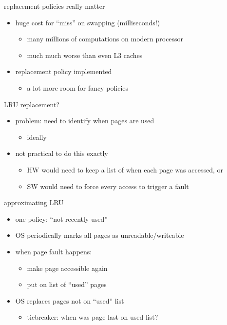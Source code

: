 
\begin{frame}{replacement policies really matter}
\begin{itemize}
\item huge cost for ``miss'' on swapping (milliseconds!)
\begin{itemize}
\item many millions of computations on modern processor
\item much much worse than even L3 caches
\end{itemize}
\item replacement policy implemented 
\begin{itemize}
\item a lot more room for fancy policies
\end{itemize}
\end{itemize}
\end{frame}

\begin{frame}{LRU replacement?}
\begin{itemize}
\item problem: need to identify when pages are used
    \begin{itemize}
    \item ideally 
    \end{itemize}
\item not practical to do this exactly
    \begin{itemize}
    \item HW would need to keep a list of when each page was accessed, or
    \item SW would need to force every access to trigger a fault
    \end{itemize}
\end{itemize}
\end{frame}

\begin{frame}{approximating LRU}
\begin{itemize}
\item one policy: ``not recently used''
\item OS periodically marks all pages as unreadable/writeable
\item when page fault happens:
    \begin{itemize}
    \item make page accessible again
    \item put on list of ``used'' pages
    \end{itemize}
\item OS replaces pages not on ``used'' list
    \begin{itemize}
    \item tiebreaker: when was page last on used list?
    \end{itemize}
\end{itemize}
\end{frame}

